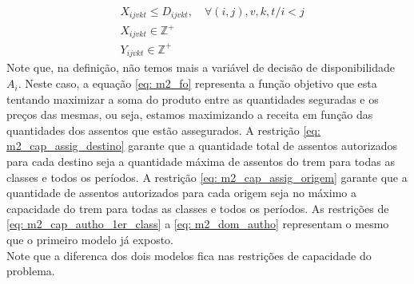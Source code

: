 \begin{align}
	 & X_{ijvkt} \leq D_{ijvkt},  \quad \forall (i,j),v,k,t/ i < j                                                                                             \label{eq: m2_assig_menor_dem}                                                                                                  \\[15pt]
	 & X_{ijvkt} \in \mathbb{Z}^+                                                                                                                              \label{eq: m2_dom_assig}                                                                                                        \\
	 & Y_{ijvkt} \in \mathbb{Z}^+                                                                                                                              \label{eq: m2_dom_autho}
\end{align}
Note que, na definição, não temos mais a variável de decisão de disponibilidade \(A_i\). Neste caso, a equação \ref{eq: m2_fo} representa a função objetivo que esta tentando maximizar a soma do produto entre as quantidades seguradas e os preços das mesmas, ou seja, estamos maximizando a receita em função das quantidades dos assentos que estão assegurados. 
A restrição \ref{eq: m2_cap_assig_destino} garante que a quantidade total de assentos autorizados para cada destino seja a quantidade máxima de assentos do trem para todas as classes e todos os períodos.
A restrição \ref{eq: m2_cap_assig_origem} garante que a quantidade de assentos autorizados para cada origem seja no máximo a capacidade do trem para todas as classes e todos os períodos.
As restrições de \ref{eq: m2_cap_autho_1er_class} a \ref{eq: m2_dom_autho} representam o mesmo que o primeiro modelo já exposto.\\
Note que a diferenca dos dois modelos fica nas restrições de capacidade do problema.